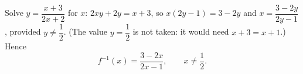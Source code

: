 Solve $y=\dfrac{x+3}{2x+2}$ for $x$: $2xy+2y=x+3$, so $x(2y-1)=3-2y$ and $x=\dfrac{3-2y}{2y-1}$, provided $y\ne\dfrac12$. (The value $y=\dfrac12$ is not taken: it would need $x+3=x+1$.) Hence
\[f^{-1}(x)=\boxed{\dfrac{3-2x}{2x-1}},\qquad x\ne\dfrac12.\]
